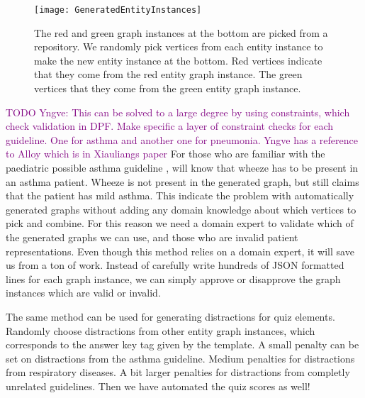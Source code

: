 \begin{figure}[h!]
	\caption {The red and green graph instances at the bottom are picked from a repository. We randomly pick vertices from each entity instance to make the new entity instance at the bottom. Red vertices indicate that they come from the red entity graph instance. The green vertices that they come from the green entity graph instance.}
	\label{fig:GeneratedEntityInstances}
	\texttt{[image: GeneratedEntityInstances]}
\end{figure}

\textcolor{purple}{TODO Yngve: This can be solved to a large degree by using constraints, which check validation in DPF. Make specific a layer of constraint checks for each guideline. One for asthma and another one for pneumonia. Yngve has a reference to Alloy which is in Xiauliangs paper}
For those who are familiar with the paediatric possible asthma guideline \parencite{RepublicofKeny2016}, will know that wheeze has to be present in an asthma patient. Wheeze is not present in the generated graph, but still claims that the patient has mild asthma. This indicate the problem with automatically generated graphs without adding any domain knowledge about which vertices to pick and combine. For this reason we need a domain expert to validate which of the generated graphs we can use, and those who are invalid patient representations. Even though this method relies on a domain expert, it will save us from a ton of work. Instead of carefully write hundreds of JSON formatted lines for each graph instance, we can simply approve or disapprove the graph instances which are valid or invalid.

The same method can be used for generating distractions for quiz elements. Randomly choose distractions from other entity graph instances, which corresponds to the answer key tag given by the template. A small penalty can be set on distractions from the asthma guideline. Medium penalties for distractions from respiratory diseases. A bit larger penalties for distractions from completly unrelated guidelines. Then we have automated the quiz scores as well!




  
